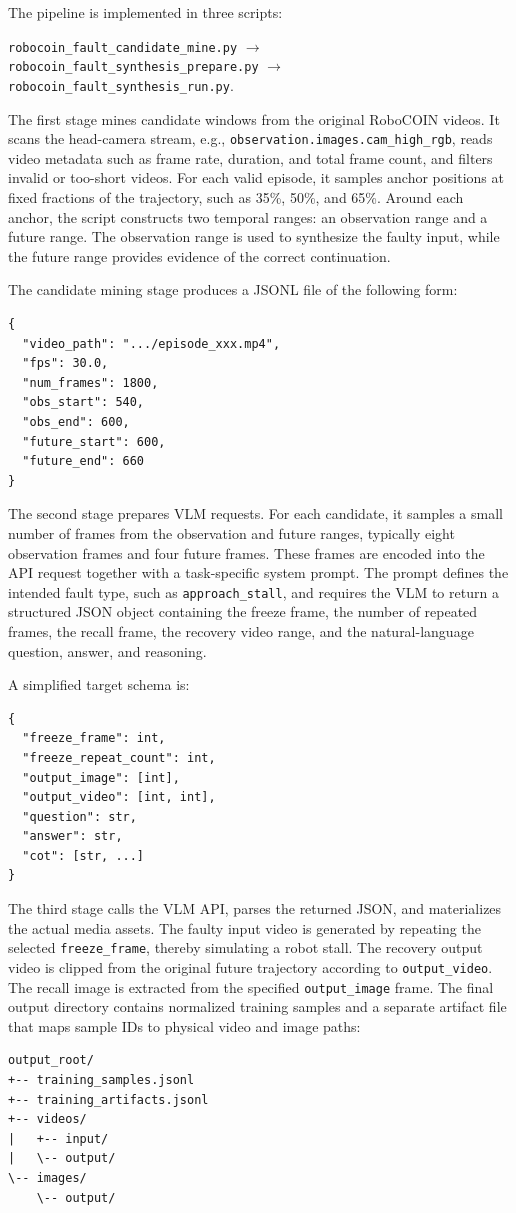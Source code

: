 \documentclass{llmxive}
\begin{document}
The pipeline is implemented in three scripts:
\begin{center}
\small
\texttt{robocoin\_fault\_candidate\_mine.py}
$\rightarrow$
\texttt{robocoin\_fault\_synthesis\_prepare.py}
$\rightarrow$
\texttt{robocoin\_fault\_synthesis\_run.py}.
\end{center}

The first stage mines candidate windows from the original RoboCOIN videos. It scans the head-camera stream, e.g., \texttt{observation.images.cam\_high\_rgb}, reads video metadata such as frame rate, duration, and total frame count, and filters invalid or too-short videos. For each valid episode, it samples anchor positions at fixed fractions of the trajectory, such as 35\%, 50\%, and 65\%. Around each anchor, the script constructs two temporal ranges: an observation range and a future range. The observation range is used to synthesize the faulty input, while the future range provides evidence of the correct continuation.

The candidate mining stage produces a JSONL file of the following form:
\begin{verbatim}
{
  "video_path": ".../episode_xxx.mp4",
  "fps": 30.0,
  "num_frames": 1800,
  "obs_start": 540,
  "obs_end": 600,
  "future_start": 600,
  "future_end": 660
}
\end{verbatim}

The second stage prepares VLM requests. For each candidate, it samples a small number of frames from the observation and future ranges, typically eight observation frames and four future frames. These frames are encoded into the API request together with a task-specific system prompt. The prompt defines the intended fault type, such as \texttt{approach\_stall}, and requires the VLM to return a structured JSON object containing the freeze frame, the number of repeated frames, the recall frame, the recovery video range, and the natural-language question, answer, and reasoning.

A simplified target schema is:
\begin{verbatim}
{
  "freeze_frame": int,
  "freeze_repeat_count": int,
  "output_image": [int],
  "output_video": [int, int],
  "question": str,
  "answer": str,
  "cot": [str, ...]
}
\end{verbatim}

The third stage calls the VLM API, parses the returned JSON, and materializes the actual media assets. The faulty input video is generated by repeating the selected \texttt{freeze\_frame}, thereby simulating a robot stall. The recovery output video is clipped from the original future trajectory according to \texttt{output\_video}. The recall image is extracted from the specified \texttt{output\_image} frame. The final output directory contains normalized training samples and a separate artifact file that maps sample IDs to physical video and image paths:
\begin{verbatim}
output_root/
+-- training_samples.jsonl
+-- training_artifacts.jsonl
+-- videos/
|   +-- input/
|   \-- output/
\-- images/
    \-- output/
\end{verbatim}
\end{document}

